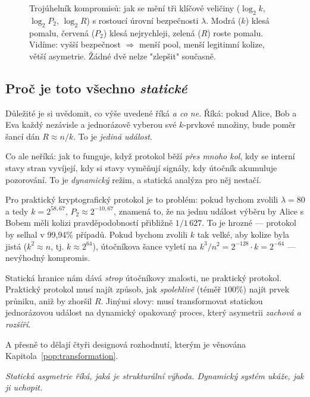 \documentclass[11pt,a4paper]{article}
\begin{document}
\begin{figure}[h]
\begin{tikzpicture}[scale=1.0]
\end{tikzpicture}
\caption{Trojúhelník kompromisů: jak se mění tři klíčové veličiny ($\log_2 k$, $\log_2 P_2$, $\log_2 R$) s rostoucí úrovní bezpečnosti $\lambda$. Modrá ($k$) klesá pomalu, červená ($P_2$) klesá nejrychleji, zelená ($R$) roste pomalu. Vidíme: vyšší bezpečnost $\Rightarrow$ menší pool, menší legitimní kolize, větší asymetrie. Žádné dvě nelze "zlepšit" současně.}
\label{fig:lambda-tradeoff}
\end{figure}

\subsection{Proč je toto všechno \emph{statické}}

Důležité je si uvědomit, co výše uvedené říká \emph{a co ne}. Říká: pokud Alice, Bob a Eva každý nezávisle a jednorázově vyberou své $k$-prvkové množiny, bude poměr šancí dán $R \approx n/k$. To je \emph{jediná událost}.

Co ale neříká: jak to funguje, když protokol běží \emph{přes mnoho kol}, kdy se interní stavy stran vyvíjejí, kdy si stavy vyměňují signály, kdy útočník akumuluje pozorování. To je \emph{dynamický} režim, a statická analýza pro něj nestačí.

Pro praktický kryptografický protokol je to problém: pokud bychom zvolili $\lambda = 80$ a tedy $k = 2^{58{,}67}$, $P_2 \approx 2^{-10{,}67}$, znamená to, že na jednu událost výběru by Alice s Bobem měli kolizi pravděpodobností přibližně $1/1\,627$. To je hrozné --- protokol by selhal v 99{,}94\% případů. Pokud bychom zvolili $k$ tak velké, aby kolize byla jistá ($k^2 \approx n$, tj. $k \approx 2^{64}$), útočníkova šance vyletí na $k^3/n^2 = 2^{-128} \cdot k = 2^{-64}$ --- nevýhodný kompromis.

\begin{aha}
Statická hranice nám dává \emph{strop} útočníkovy znalosti, ne praktický protokol. Praktický protokol musí najít způsob, jak \emph{spolehlivě} (téměř $100\%$) najít prvek průniku, aniž by zhoršil $R$. Jinými slovy: musí transformovat statickou jednorázovou událost na dynamický opakovaný proces, který asymetrii \emph{zachová a rozšíří}.
\end{aha}

A přesně to dělají čtyři designová rozhodnutí, kterým je věnována Kapitola~\ref{pop:transformation}.

\medskip
\noindent\textit{Statická asymetrie říká, jaká je strukturální výhoda. Dynamický systém ukáže, jak ji uchopit.}
\end{document}
